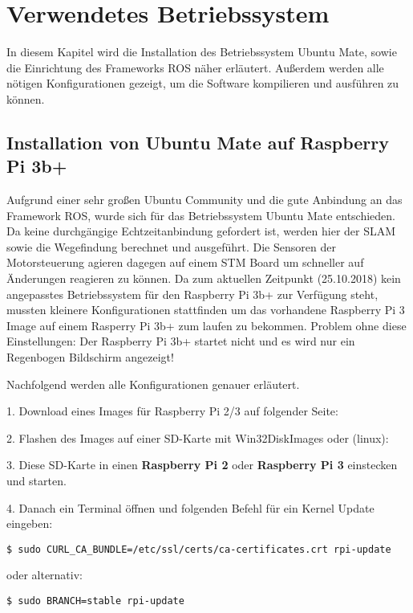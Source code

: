 \chapter{Verwendetes Betriebssystem}
In diesem Kapitel wird die Installation des Betriebssystem Ubuntu Mate, sowie die Einrichtung des Frameworks ROS näher erläutert. Außerdem werden alle nötigen Konfigurationen gezeigt, um die Software kompilieren und ausführen zu können. 


\section{Installation von Ubuntu Mate auf Raspberry Pi 3b+}
Aufgrund einer sehr großen Ubuntu Community und die gute Anbindung an das Framework ROS, wurde sich für das Betriebssystem Ubuntu Mate entschieden. Da keine durchgängige Echtzeitanbindung gefordert ist, werden hier der SLAM sowie die Wegefindung berechnet und ausgeführt. Die Sensoren der Motorsteuerung agieren dagegen auf einem STM Board um schneller auf Änderungen reagieren zu können. 
Da zum aktuellen Zeitpunkt (25.10.2018) kein angepasstes Betriebssystem für den Raspberry Pi 3b+ zur Verfügung steht, mussten kleinere Konfigurationen stattfinden um das vorhandene Raspberry Pi 3 Image auf einem Rasperry Pi 3b+ zum laufen zu bekommen. 
Problem ohne diese Einstellungen: Der Raspberry Pi 3b+ startet nicht und es wird nur ein Regenbogen Bildschirm angezeigt!

Nachfolgend werden alle Konfigurationen genauer erläutert. 

1. Download eines Images für Raspberry  Pi 2/3 auf folgender Seite:

2. Flashen des Images auf einer SD-Karte mit Win32DiskImages oder (linux):

3. Diese SD-Karte in einen \textbf{Raspberry Pi 2} oder \textbf{Raspberry Pi 3} einstecken und starten. 

4. Danach ein Terminal öffnen und folgenden Befehl für ein Kernel Update eingeben:

\begin{lstlisting}
$ sudo CURL_CA_BUNDLE=/etc/ssl/certs/ca-certificates.crt rpi-update

\end{lstlisting}

oder alternativ: 


\begin{lstlisting}
$ sudo BRANCH=stable rpi-update

\end{lstlisting}

